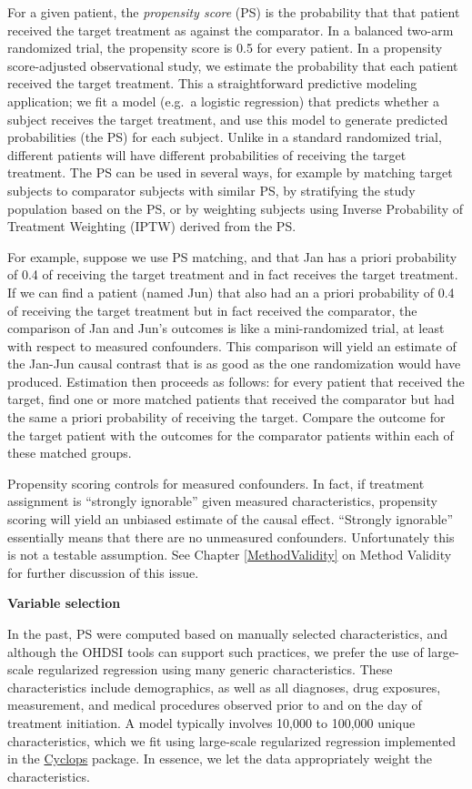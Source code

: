 \documentclass[]{book}
\begin{document}
For a given patient, the \emph{propensity score} (PS) is the probability
that that patient received the target treatment as against the
comparator. \citep{rosenbaum_1983} In a balanced two-arm randomized
trial, the propensity score is 0.5 for every patient. In a propensity
score-adjusted observational study, we estimate the probability that
each patient received the target treatment. This a straightforward
predictive modeling application; we fit a model (e.g.~a logistic
regression) that predicts whether a subject receives the target
treatment, and use this model to generate predicted probabilities (the
PS) for each subject. Unlike in a standard randomized trial, different
patients will have different probabilities of receiving the target
treatment. The PS can be used in several ways, for example by matching
target subjects to comparator subjects with similar PS, by stratifying
the study population based on the PS, or by weighting subjects using
Inverse Probability of Treatment Weighting (IPTW) derived from the PS.

For example, suppose we use PS matching, and that Jan has a priori
probability of 0.4 of receiving the target treatment and in fact
receives the target treatment. If we can find a patient (named Jun) that
also had an a priori probability of 0.4 of receiving the target
treatment but in fact received the comparator, the comparison of Jan and
Jun's outcomes is like a mini-randomized trial, at least with respect to
measured confounders. This comparison will yield an estimate of the
Jan-Jun causal contrast that is as good as the one randomization would
have produced. Estimation then proceeds as follows: for every patient
that received the target, find one or more matched patients that
received the comparator but had the same a priori probability of
receiving the target. Compare the outcome for the target patient with
the outcomes for the comparator patients within each of these matched
groups.

Propensity scoring controls for measured confounders. In fact, if
treatment assignment is ``strongly ignorable'' given measured
characteristics, propensity scoring will yield an unbiased estimate of
the causal effect. ``Strongly ignorable'' essentially means that there
are no unmeasured confounders. Unfortunately this is not a testable
assumption. See Chapter \ref{MethodValidity} on Method Validity for
further discussion of this issue.

\textbf{Variable selection}

In the past, PS were computed based on manually selected
characteristics, and although the OHDSI tools can support such
practices, we prefer the use of large-scale regularized regression using
many generic characteristics. \citep{tian_2018} These characteristics
include demographics, as well as all diagnoses, drug exposures,
measurement, and medical procedures observed prior to and on the day of
treatment initiation. A model typically involves 10,000 to 100,000
unique characteristics, which we fit using large-scale regularized
regression \citep{suchard_2013} implemented in the
\href{https://ohdsi.github.io/Cyclops/}{Cyclops} package. In essence, we
let the data appropriately weight the characteristics.
\end{document}

